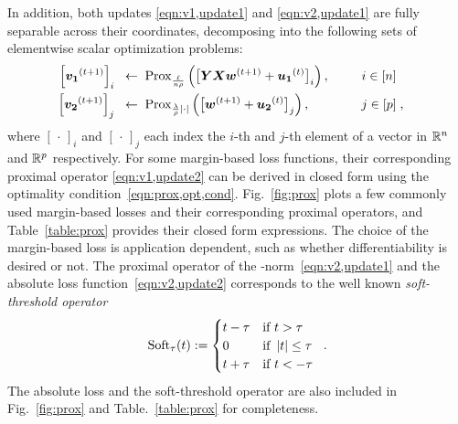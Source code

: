 In addition, both updates \eqref{eqn:v1,update1} and \eqref{eqn:v2,update1} are fully separable across their coordinates, decomposing into the following sets of elementwise scalar optimization problems:
\begin{alignat}{3} 
  \left[{\bm{v_1}}^{(t+1)}\right]_i \;\;\leftarrow \;\;&
  	\mathrm{Prox}_{\frac{\ell}{n\rho}}\left(\big[ {\bm{Y}}{\bm{X}}{\bm{w}}^{(t+1)} + {\bm{u_1}}^{(t)} \big]_i\right) ,
  	& \;\;\;\;\;\; i\in[n] \label{eqn:v1,update2} \\
  \left[{\bm{v_2}}^{(t+1)}\right]_j \;\;\leftarrow \;\;&
  	\mathrm{Prox}_{\frac{\lambda}{\rho}\left| \cdot \right|}\left(\big[ {\bm{w}}^{(t+1)}+{\bm{u_2}}^{(t)} \big]_j\right) ,
  	& j\in[p] &\;,\label{eqn:v2,update2} 
\end{alignat}
where $[\,\cdot\,]_i$ and $[\,\cdot\,]_j$ each index the $i$-th and $j$-th element of a vector in $\mathbb{R}^n$ and $\mathbb{R}^p$ respectively.
For some margin-based loss functions, their corresponding proximal operator \eqref{eqn:v1,update2} can be derived in closed form using the optimality condition~\eqref{eqn:prox,opt,cond}.
Fig.~\ref{fig:prox} plots a few commonly used margin-based losses and their corresponding proximal operators, and Table~\ref{table:prox} provides their closed form expressions.
The choice of the margin-based loss is application dependent, such as whether differentiability is desired or not.
The proximal operator of the \ellone-norm~\eqref{eqn:v2,update1} and the absolute loss function~\eqref{eqn:v2,update2} corresponds to the well known \emph{soft-threshold operator} \citep{Donoho:1995}
\begin{equation}
	\text{Soft}_\tau(t):=
		\begin{cases}
			t-\tau & \text{if } t > \tau \\
			0		& \text{if } \left| t \right|\leq \tau \\
			t+\tau	& \text{if } t < -\tau
		\end{cases} \;\;.
	\label{eqn:soft,thresh}
\end{equation}
The absolute loss and the soft-threshold operator are also included in Fig.~\ref{fig:prox} and Table.~\ref{table:prox} for completeness.

